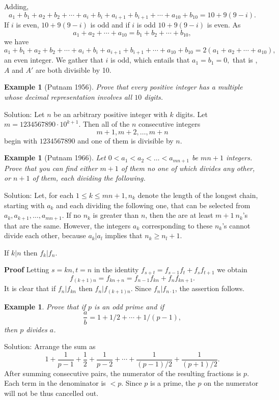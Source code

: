 \documentclass[11pt, openany]{book}
\theoremstyle{change} \theoremheaderfont{\blue\sffamily\bfseries}
\newtheorem{exa}[thm]{Example}
\theoremstyle{nonumberplain} \theoremheaderfont{\sffamily\bfseries}
\newcommand{\í}{\'{\i}}
\begin{document}
Adding,
$$a_1 + b_1 + a_2 + b_2 + \cdots + a_i + b_i + a_{i + 1} + b_{i + 1} + \cdots + a_{10} + b_{10}
= 10 + 9(9 - i). $$If  $i$ is even, $10 + 9(9 - i)$ is odd and if
$i$ is odd $10 + 9(9 - i)$ is even. As
$$a_1 + a_2 + \cdots + a_{10} = b_1 + b_2 + \cdots + b_{10},$$ we have
$$a_1 + b_1 + a_2 + b_2 + \cdots + a_i + b_i + a_{i + 1} + b_{i + 1} + \cdots + a_{10} + b_{10}
= 2(a_1 + a_2 + \cdots + a_{10}), $$an even integer. We gather
that $i$ is odd, which entails that $a_1 = b_1 = 0,$ that is , $A$
and $A'$ are both divisible by 10.
\begin{exa}[Putnam 1956] Prove that every positive integer has a multiple
whose decimal representation involves all $10$ digits.
\end{exa}
Solution: Let $n$ be an arbitrary positive integer with $k$
digits. Let $m = 1234567890\cdot 10^{k + 1}$. Then all of the $n$
consecutive integers
$$m + 1, m + 2, \ldots, m + n$$begin with $1234567890$ and one of them is divisible by $n$.

\begin{exa}[Putnam 1966] Let $0 < a_1 < a_2 < \ldots < a_{mn +
1}$ be $mn + 1$ integers. Prove that you can find either $m + 1$
of them no one of which divides any other, or $n + 1$ of them,
each dividing the following. \end{exa} Solution: Let, for each $1
\leq k \leq mn + 1, n_k$ denote the length of the longest chain,
starting with $a_k$ and each dividing the following one, that can
be selected from $a_k , a_{k + 1}, \ldots , a_{mn + 1}$. If no
$n_k $ is greater than $n$, then the are at least $m + 1 \ n_k$'s
that are the same. However, the integers $a_k$ corresponding to
these $n_k$'s cannot divide each other, because $a_k |a_l$ implies
that $n_k \geq n_l + 1.$
\begin{thm} If $k|n$ then $f_k|f_n$.\end{thm}
{\bf Proof} Letting $s = kn, t = n$ in the identity $f_{s + t} =
f_{s - 1}f_t + f_{s}f_{t + 1}$ we obtain
$$ f_{(k + 1)n} = f_{kn + n} = f_{n - 1}f_{kn} + f_nf_{kn + 1}.$$It is clear
that if $f_n|f_{kn}$ then $f_n|f_{(k + 1)n}$. Since $f_n|f_{n\cdot
1}$, the assertion follows.


\begin{exa} Prove that if $p$ is an odd prime and if $$ \frac{a}{b} = 1 + 1/2 + \cdots + 1/(p - 1),$$
then $p$ divides $a$. \end{exa} Solution: Arrange the sum as $$ 1
+ \frac{1}{p - 1} + \frac{1}{2} + \frac{1}{p - 2} + \cdots +
\frac{1}{(p - 1)/2} + \frac{1}{(p + 1)/2}.$$ After summing
consecutive pairs, the numerator of the resulting fractions is
$p$. Each term in the denominator is $< p$. Since $p$ is a prime,
the $p$ on the numerator will not be thus cancelled out.
\end{document}
